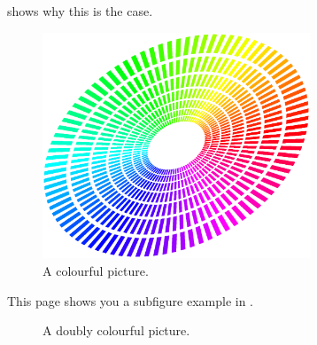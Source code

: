  shows why this is the case.
\begin{figure}[!htb]
  \centering
  \includegraphics[width=8cm]{figure}
  \caption{A colourful picture.}
  \label{Figure:figex}
\end{figure}

This page shows you a subfigure example in .
\begin{figure}[!htb]
  \centering
  \caption{A doubly colourful picture.}
  \label{Figure:figsubex}
\end{figure}
\fi